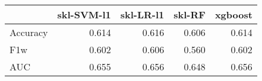 \begin{tabular}{lrrrr}
\toprule
{} &  skl-SVM-l1 &  skl-LR-l1 &  skl-RF &  xgboost \\
\midrule
Accuracy &       0.614 &      0.616 &   0.606 &    0.614 \\
F1w      &       0.602 &      0.606 &   0.560 &    0.602 \\
AUC      &       0.655 &      0.656 &   0.648 &    0.656 \\
\bottomrule
\end{tabular}
